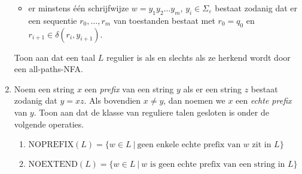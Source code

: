\documentclass[a4paper]{article}
\begin{document}
\begin{enumerate}
\begin{itemize}
               \item er minstens \'e\'en schrijfwijze $w = y_1 y_2 \ldots y_m$, $y_i \in \Sigma_{\varepsilon}$ bestaat zodanig dat er een sequentie $r_0, \ldots, r_m$ van toestanden bestaat met $r_0 = q_0$ en $r_{i+1} \in \delta(r_i,y_{i+1})$.
            \end{itemize}
				Toon aan dat een taal $L$ regulier is als en slechts als ze herkend wordt door een all-paths-NFA.
		\item Noem een string $x$ een \emph{prefix} van een string $y$ als er een string $z$ bestaat zodanig dat $y = xz$. Als bovendien $x \neq y$, dan noemen we $x$ een \emph{echte prefix} van $y$. Toon aan dat de klasse van reguliere talen gesloten is onder de volgende operaties.
				\begin{enumerate}
					\item $\mathrm{NOPREFIX} (L) = \{ w \in L \ | \ \mbox{geen enkele echte prefix van $w$ zit in $L$} \}$
					\item $\mathrm{NOEXTEND} (L) = \{ w \in L \ | \ \mbox{$w$ is geen echte prefix van een string in $L$} \}$
				\end{enumerate}
	\end{enumerate}
\end{document}
